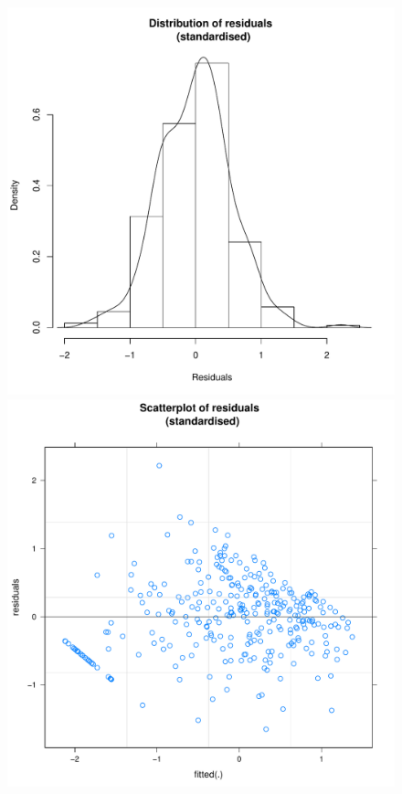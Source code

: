 \begin{CJK}{UTF8}{gbsn}
       \begin{figure}[htbp]
         \includegraphics[scale =.4]{images/MLM31aHist.pdf}
         \includegraphics[scale =.4]{images/MLM31aScatter.pdf}

\end{figure}
\end{CJK}
